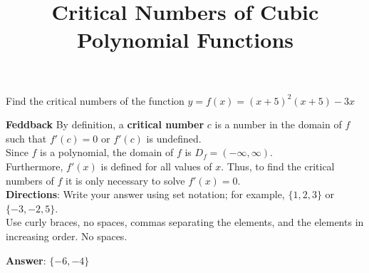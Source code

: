 \documentclass{ximera}
\title{Critical Numbers of Cubic Polynomial Functions}
\begin{document}
\maketitle

 Find the critical numbers of the function  \(\displaystyle   y = f(x) = (x+5)^2\left(x+5\right)-3x\)
	  
\textbf{Feddback} 	By definition, a \textbf{critical number} \(c\) is a number in the domain of \(f\) such that \(f'(c)=0\) or     \(f'(c)\) is undefined.  
\\Since \(f\) is a polynomial, the domain of \(f\) is \( D_f = (-\infty, \infty)\).   
\\Furthermore, \(f'(x)\) is defined for all values of \(x\). Thus, to find the critical numbers of \(f\) it is only necessary to solve \(f'(x)=0\). 	  
\\\textbf{Directions}:   	Write your answer using set notation; for example, \(\{1,2,3\}\) or \(\{-3,-2,5\}\).  
\\ Use curly braces, no spaces, commas separating the elements, and the elements in increasing order. No spaces.

\textbf{Answer}:  	\(\{-6,-4\}\)
\end{document}
